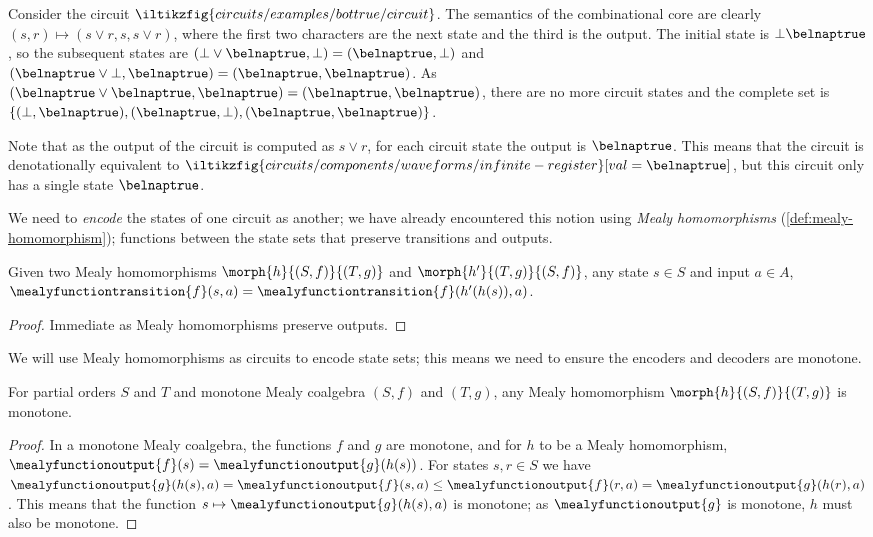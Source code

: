 \documentclass{lmcs}
\begin{document}
\begin{exa}\label{ex:circuit-states}
    Consider the circuit \(
    \iltikzfig{circuits/examples/bottrue/circuit}
    \).
    The semantics of the combinational core are clearly
    \((s, r) \mapsto \left(s \lor r, s, s \lor r\right)\), where the first two characters are the
    next state and the third is the output.
    The initial state is \(\bot\belnaptrue\), so the subsequent states are
    \((\bot \lor \belnaptrue, \bot) = (\belnaptrue,\bot)\) and
    \((\belnaptrue \lor \bot, \belnaptrue) = (\belnaptrue, \belnaptrue)\).
    As \((\belnaptrue \lor \belnaptrue, \belnaptrue) = (\belnaptrue, \belnaptrue)\),
    there are no more circuit states and the complete set is
    \(\{(\bot, \belnaptrue),(\belnaptrue,\bot),(\belnaptrue,\belnaptrue)\}\).

    Note that as the output of the circuit is computed as \(s \lor r\), for each
    circuit state the output is \(\belnaptrue\).
    This means that the circuit is denotationally equivalent to \(
    \iltikzfig{circuits/components/waveforms/infinite-register}[val=\belnaptrue]
    \), but this circuit only has a single state \(\belnaptrue\).
\end{exa}

We need to \emph{encode} the states of one circuit as another; we have already
encountered this notion using \emph{Mealy homomorphisms}
(\autoref{def:mealy-homomorphism});
functions between the state sets that preserve transitions and outputs.

\begin{lem}
    Given two Mealy homomorphisms \(\morph{h}{(S,f)}{(T,g)}\) and
    \(\morph{h^\prime}{(T,g)}{(S,f)}\), any state \(s \in S\) and input
    \(a \in A\), \(
    \mealyfunctiontransition{f}(s, a)
    =
    \mealyfunctiontransition{f}(h^\prime(h(s)), a)
    \).
\end{lem}
\begin{proof}
    Immediate as Mealy homomorphisms preserve outputs.
\end{proof}

We will use Mealy homomorphisms as circuits to encode state sets; this means we
need to ensure the encoders and decoders are monotone.

\begin{lem}
    For partial orders \(S\) and \(T\) and monotone Mealy coalgebra
    \((S,f)\) and \((T,g)\), any Mealy homomorphism \(\morph{h}{(S,f)}{(T,g)}\)
    is monotone.
\end{lem}
\begin{proof}
    In a monotone Mealy coalgebra, the functions \(f\) and \(g\) are monotone,
    and for \(h\) to be a Mealy homomorphism, \(
    \mealyfunctionoutput{f}(s)
    =
    \mealyfunctionoutput{g}(h(s))
    \).
    For states \(s,r \in S\) we have \(
    \mealyfunctionoutput{g}(h(s), a)
    =
    \mealyfunctionoutput{f}(s, a)
    \leq
    \mealyfunctionoutput{f}(r, a)
    =
    \mealyfunctionoutput{g}(h(r), a)
    \).
    This means that the function \(
    s \mapsto \mealyfunctionoutput{g}(h(s), a)
    \) is monotone; as \(\mealyfunctionoutput{g}\) is monotone, \(h\) must
    also be monotone.
\end{proof}
\end{document}
